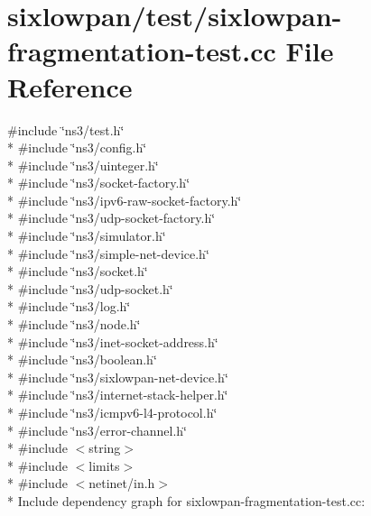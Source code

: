 \hypertarget{sixlowpan-fragmentation-test_8cc}{}\section{sixlowpan/test/sixlowpan-\/fragmentation-\/test.cc File Reference}
\label{sixlowpan-fragmentation-test_8cc}
{\ttfamily \#include \char`\"{}ns3/test.\+h\char`\"{}}\\*
{\ttfamily \#include \char`\"{}ns3/config.\+h\char`\"{}}\\*
{\ttfamily \#include \char`\"{}ns3/uinteger.\+h\char`\"{}}\\*
{\ttfamily \#include \char`\"{}ns3/socket-\/factory.\+h\char`\"{}}\\*
{\ttfamily \#include \char`\"{}ns3/ipv6-\/raw-\/socket-\/factory.\+h\char`\"{}}\\*
{\ttfamily \#include \char`\"{}ns3/udp-\/socket-\/factory.\+h\char`\"{}}\\*
{\ttfamily \#include \char`\"{}ns3/simulator.\+h\char`\"{}}\\*
{\ttfamily \#include \char`\"{}ns3/simple-\/net-\/device.\+h\char`\"{}}\\*
{\ttfamily \#include \char`\"{}ns3/socket.\+h\char`\"{}}\\*
{\ttfamily \#include \char`\"{}ns3/udp-\/socket.\+h\char`\"{}}\\*
{\ttfamily \#include \char`\"{}ns3/log.\+h\char`\"{}}\\*
{\ttfamily \#include \char`\"{}ns3/node.\+h\char`\"{}}\\*
{\ttfamily \#include \char`\"{}ns3/inet-\/socket-\/address.\+h\char`\"{}}\\*
{\ttfamily \#include \char`\"{}ns3/boolean.\+h\char`\"{}}\\*
{\ttfamily \#include \char`\"{}ns3/sixlowpan-\/net-\/device.\+h\char`\"{}}\\*
{\ttfamily \#include \char`\"{}ns3/internet-\/stack-\/helper.\+h\char`\"{}}\\*
{\ttfamily \#include \char`\"{}ns3/icmpv6-\/l4-\/protocol.\+h\char`\"{}}\\*
{\ttfamily \#include \char`\"{}ns3/error-\/channel.\+h\char`\"{}}\\*
{\ttfamily \#include $<$string$>$}\\*
{\ttfamily \#include $<$limits$>$}\\*
{\ttfamily \#include $<$netinet/in.\+h$>$}\\*
Include dependency graph for sixlowpan-\/fragmentation-\/test.cc\+:
